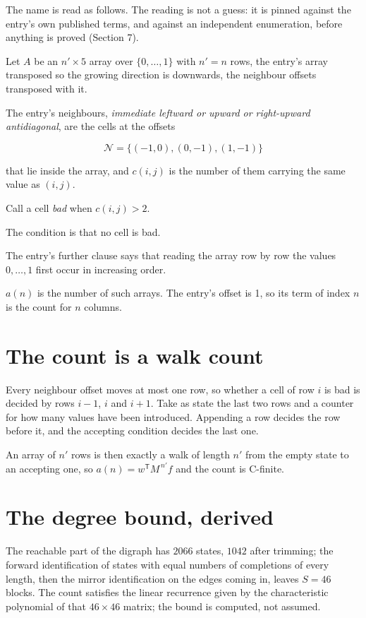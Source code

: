\documentclass[11pt]{article}
\theoremstyle{definition}
\begin{document}
The name is read as follows. The reading is not a guess: it is pinned against the entry's own published terms, and against an independent enumeration, before anything is proved (Section 7).

Let $A$ be an $n' \times 5$ array over $\{0,\dots,1\}$ with $n' = n$ rows, the entry's array transposed so the growing direction is downwards, the neighbour offsets transposed with it.

The entry's neighbours, {\itshape immediate leftward or upward or right-upward antidiagonal}, are the cells at the offsets

\[\mathcal{N} = \{(-1,0), (0,-1), (1,-1)\}\]

that lie inside the array, and $c(i,j)$ is the number of them carrying the same value as $(i,j)$.

Call a cell {\itshape bad} when $c(i,j) > 2$.

The condition is that no cell is bad.

The entry's further clause says that reading the array row by row the values $0,\dots,1$ first occur in increasing order.

$a(n)$ is the number of such arrays. The entry's offset is 1, so its term of index $n$ is the count for $n$ columns.

\section{The count is a walk count}

Every neighbour offset moves at most one row, so whether a cell of row $i$ is bad is decided by rows $i-1$, $i$ and $i+1$. Take as state the last two rows and a counter for how many values have been introduced. Appending a row decides the row before it, and the accepting condition decides the last one.

An array of $n'$ rows is then exactly a walk of length $n'$ from the empty state to an accepting one, so $a(n) = w^{\mathsf T}M^{\,n'}f$ and the count is C-finite.

\section{The degree bound, derived}

The reachable part of the digraph has $2066$ states, $1042$ after trimming; the forward identification of states with equal numbers of completions of every length, then the mirror identification on the edges coming in, leaves $S = 46$ blocks. The count satisfies the linear recurrence given by the characteristic polynomial of that $46\times46$ matrix; the bound is computed, not assumed.
\end{document}
